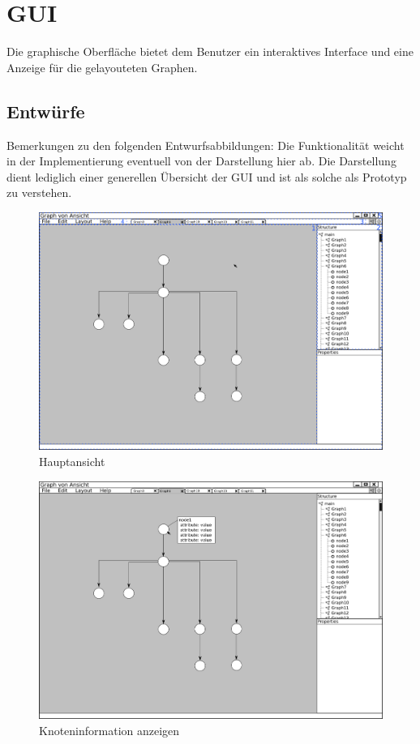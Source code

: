 \section{GUI}\label{sec:uigui}

Die graphische Oberfläche bietet dem Benutzer ein interaktives Interface und eine Anzeige für die gelayouteten Graphen. %

\subsection{Entwürfe}

Bemerkungen zu den folgenden Entwurfsabbildungen: Die Funktionalität weicht in der Implementierung eventuell von der Darstellung hier ab. Die Darstellung dient lediglich einer generellen Übersicht der GUI und ist als solche als Prototyp zu verstehen.

\begin{figure}[ht]
  \centering
  \includegraphics[width=380pt]{resourcen/gui_view_treeview.png}
  \caption{Hauptansicht}
  \label{fig:gui_view_treeview}
\end{figure}

\begin{figure}[ht]
  \centering
  \includegraphics[width=380pt]{resourcen/gui_view_showInfoInView_node.png}
  \caption{Knoteninformation anzeigen}
  \label{fig:gui_view_showInfoInView_node}
\end{figure}

